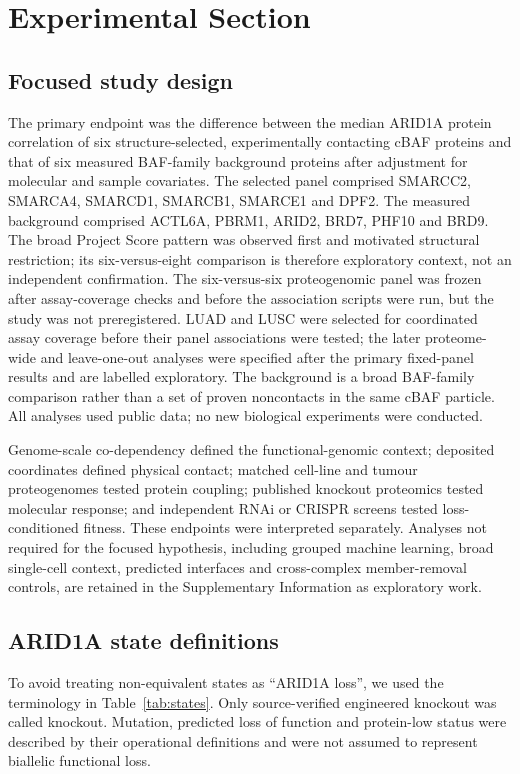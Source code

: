 \documentclass[journal=jprobs,manuscript=article,layout=traditional]{achemso}
\begin{document}
\section{Experimental Section}

\subsection{Focused study design}

The primary endpoint was the difference between the median ARID1A protein correlation of six structure-selected, experimentally contacting cBAF proteins and that of six measured BAF-family background proteins after adjustment for molecular and sample covariates. The selected panel comprised SMARCC2, SMARCA4, SMARCD1, SMARCB1, SMARCE1 and DPF2. The measured background comprised ACTL6A, PBRM1, ARID2, BRD7, PHF10 and BRD9. The broad Project Score pattern was observed first and motivated structural restriction; its six-versus-eight comparison is therefore exploratory context, not an independent confirmation. The six-versus-six proteogenomic panel was frozen after assay-coverage checks and before the association scripts were run, but the study was not preregistered. LUAD and LUSC were selected for coordinated assay coverage before their panel associations were tested; the later proteome-wide and leave-one-out analyses were specified after the primary fixed-panel results and are labelled exploratory. The background is a broad BAF-family comparison rather than a set of proven noncontacts in the same cBAF particle. All analyses used public data; no new biological experiments were conducted.

Genome-scale co-dependency defined the functional-genomic context; deposited coordinates defined physical contact; matched cell-line and tumour proteogenomes tested protein coupling; published knockout proteomics tested molecular response; and independent RNAi or CRISPR screens tested loss-conditioned fitness. These endpoints were interpreted separately. Analyses not required for the focused hypothesis, including grouped machine learning, broad single-cell context, predicted interfaces and cross-complex member-removal controls, are retained in the Supplementary Information as exploratory work.

\subsection{ARID1A state definitions}

To avoid treating non-equivalent states as ``ARID1A loss'', we used the terminology in Table~\ref{tab:states}. Only source-verified engineered knockout was called knockout. Mutation, predicted loss of function and protein-low status were described by their operational definitions and were not assumed to represent biallelic functional loss.
\end{document}
